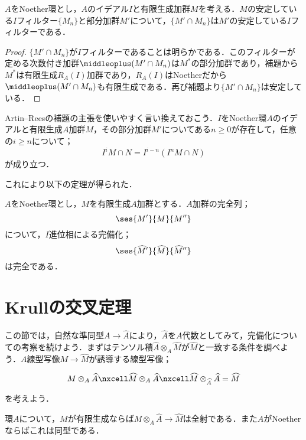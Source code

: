 \begin{thm}\label{prop:Artin--Reesの補題}
	$A$をNoether環とし，$A$のイデアル$I$と有限生成加群$M$を考える．$M$の安定している$I$フィルター$\{M_n\}$と部分加群$M'$について，$\{M'\cap M_n\}$は$M'$の安定している$I$フィルターである．
\end{thm}

\begin{proof}
	$\{M'\cap M_n\}$が$I$フィルターであることは明らかである．このフィルターが定める次数付き加群$\middleoplus (M'\cap M_n)$は$M^\ast$の部分加群であり，補題から$M^\ast$は有限生成$R_A(I)$加群であり，$R_A(I)$はNoetherだから$\middleoplus (M'\cap M_n)$も有限生成である．再び補題より$\{M'\cap M_n\}$は安定している．
\end{proof}

Artin--Reesの補題の主張を使いやすく言い換えておこう．$I$をNoether環$A$のイデアルと有限生成$A$加群$M$，その部分加群$M'$についてある$n\geq 0$が存在して，任意の$i\geq n$について；
\[I^iM\cap N=I^{i-n}(I^nM\cap N)\]
が成り立つ．

これにより以下の定理が得られた．

\begin{thm}
	$A$をNoether環とし，$M$を有限生成$A$加群とする．$A$加群の完全列；
	\[\ses{M'}{M}{M''}\]
	について，$I$進位相による完備化；
	\[\ses{\widehat{M}'}{\widehat{M}}{\widehat{M}''}\]
	は完全である．
\end{thm}

\section{Krullの交叉定理}

この節では，自然な準同型$A\to\widehat{A}$により，$\widehat{A}$を$A$代数としてみて，完備化についての考察を続けよう．まずはテンソル積$\widehat{A}\otimes_A \widehat{M}$が$\widehat{M}$と一致する条件を調べよう．$A$線型写像$M\to\widehat{M}$が誘導する線型写像；
\[\begin{tikzcd}
	M\otimes_A 
	\widehat{A}\nxcell\widehat{M}\otimes_A\widehat{A}\nxcell\widehat{M}\otimes_{\widehat{A}}\widehat{A}=\widehat{M}
\end{tikzcd}\]
を考えよう．

\begin{prop}\label{prop:有限生成なら完備化は係数拡大}
	環$A$について，$M$が有限生成ならば$M\otimes_A \widehat{A}\to\widehat{M}$は全射である．また$A$がNoetherならばこれは同型である．
\end{prop}

